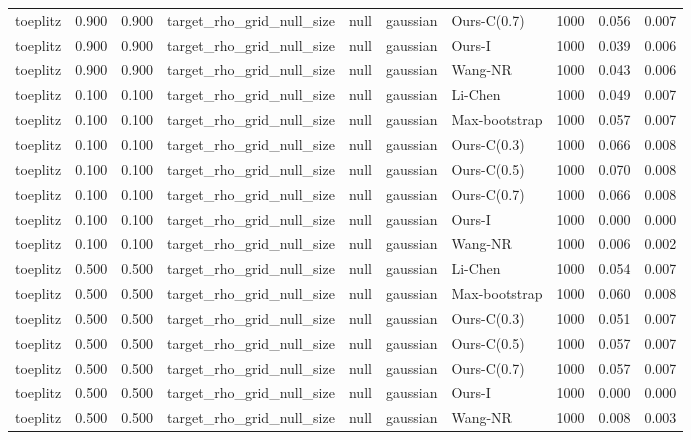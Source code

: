 \begin{tabular}{lrrllllrrr}
toeplitz & 0.900 & 0.900 & target\_rho\_grid\_null\_size & null & gaussian & Ours-C(0.7) & 1000 & 0.056 & 0.007 \\
toeplitz & 0.900 & 0.900 & target\_rho\_grid\_null\_size & null & gaussian & Ours-I & 1000 & 0.039 & 0.006 \\
toeplitz & 0.900 & 0.900 & target\_rho\_grid\_null\_size & null & gaussian & Wang-NR & 1000 & 0.043 & 0.006 \\
toeplitz & 0.100 & 0.100 & target\_rho\_grid\_null\_size & null & gaussian & Li-Chen & 1000 & 0.049 & 0.007 \\
toeplitz & 0.100 & 0.100 & target\_rho\_grid\_null\_size & null & gaussian & Max-bootstrap & 1000 & 0.057 & 0.007 \\
toeplitz & 0.100 & 0.100 & target\_rho\_grid\_null\_size & null & gaussian & Ours-C(0.3) & 1000 & 0.066 & 0.008 \\
toeplitz & 0.100 & 0.100 & target\_rho\_grid\_null\_size & null & gaussian & Ours-C(0.5) & 1000 & 0.070 & 0.008 \\
toeplitz & 0.100 & 0.100 & target\_rho\_grid\_null\_size & null & gaussian & Ours-C(0.7) & 1000 & 0.066 & 0.008 \\
toeplitz & 0.100 & 0.100 & target\_rho\_grid\_null\_size & null & gaussian & Ours-I & 1000 & 0.000 & 0.000 \\
toeplitz & 0.100 & 0.100 & target\_rho\_grid\_null\_size & null & gaussian & Wang-NR & 1000 & 0.006 & 0.002 \\
toeplitz & 0.500 & 0.500 & target\_rho\_grid\_null\_size & null & gaussian & Li-Chen & 1000 & 0.054 & 0.007 \\
toeplitz & 0.500 & 0.500 & target\_rho\_grid\_null\_size & null & gaussian & Max-bootstrap & 1000 & 0.060 & 0.008 \\
toeplitz & 0.500 & 0.500 & target\_rho\_grid\_null\_size & null & gaussian & Ours-C(0.3) & 1000 & 0.051 & 0.007 \\
toeplitz & 0.500 & 0.500 & target\_rho\_grid\_null\_size & null & gaussian & Ours-C(0.5) & 1000 & 0.057 & 0.007 \\
toeplitz & 0.500 & 0.500 & target\_rho\_grid\_null\_size & null & gaussian & Ours-C(0.7) & 1000 & 0.057 & 0.007 \\
toeplitz & 0.500 & 0.500 & target\_rho\_grid\_null\_size & null & gaussian & Ours-I & 1000 & 0.000 & 0.000 \\
toeplitz & 0.500 & 0.500 & target\_rho\_grid\_null\_size & null & gaussian & Wang-NR & 1000 & 0.008 & 0.003 \\

\end{tabular}
